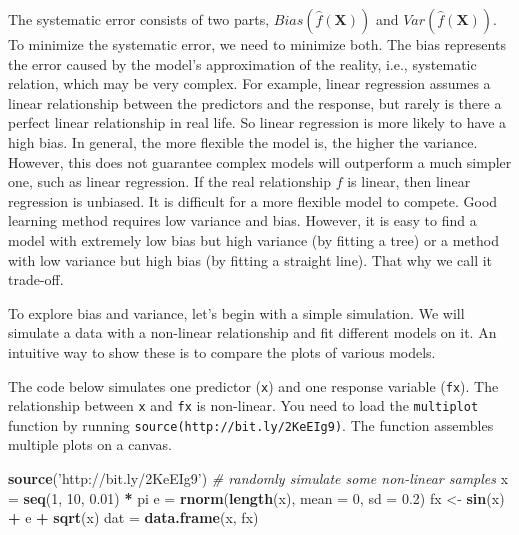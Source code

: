 \documentclass[12pt,]{krantz}
\makeatletter
\newenvironment{Shaded}{\begin{snugshade}}{\end{snugshade}}
\newcommand{\CommentTok}[1]{\textcolor[rgb]{0.37,0.37,0.37}{\textit{#1}}}
\newcommand{\DataTypeTok}[1]{\textcolor[rgb]{0.27,0.27,0.27}{#1}}
\newcommand{\DecValTok}[1]{\textcolor[rgb]{0.06,0.06,0.06}{#1}}
\newcommand{\FloatTok}[1]{\textcolor[rgb]{0.06,0.06,0.06}{#1}}
\newcommand{\KeywordTok}[1]{\textcolor[rgb]{0.27,0.27,0.27}{\textbf{#1}}}
\newcommand{\NormalTok}[1]{#1}
\newcommand{\OperatorTok}[1]{\textcolor[rgb]{0.43,0.43,0.43}{\textbf{#1}}}
\newcommand{\StringTok}[1]{\textcolor[rgb]{0.5,0.5,0.5}{#1}}
\newenvironment{kframe}{%
\medskip{}
\setlength{\fboxsep}{.8em}
 \def\at@end@of@kframe{}%
 \ifinner\ifhmode%
  \def\at@end@of@kframe{\end{minipage}}%
  \begin{minipage}{\columnwidth}%
 \fi\fi%
 \def\FrameCommand##1{\hskip\@totalleftmargin \hskip-\fboxsep
 \colorbox{shadecolor}{##1}\hskip-\fboxsep
     \hskip-\linewidth \hskip-\@totalleftmargin \hskip\columnwidth}%
 \MakeFramed {\advance\hsize-\width
   \@totalleftmargin\z@ \linewidth\hsize
   \@setminipage}}%
 {\par\unskip\endMakeFramed%
 \at@end@of@kframe}
\renewenvironment{Shaded}{\begin{kframe}}{\end{kframe}}
\makeatother
\begin{document}
The systematic error consists of two parts, \(Bias(\hat{f}(\mathbf{X}))\) and \(Var (\hat{f}(\mathbf{X}))\). To minimize the systematic error, we need to minimize both. The bias represents the error caused by the model's approximation of the reality, i.e., systematic relation, which may be very complex. For example, linear regression assumes a linear relationship between the predictors and the response, but rarely is there a perfect linear relationship in real life. So linear regression is more likely to have a high bias. In general, the more flexible the model is, the higher the variance. However, this does not guarantee complex models will outperform a much simpler one, such as linear regression. If the real relationship \(f\) is linear, then linear regression is unbiased. It is difficult for a more flexible model to compete. Good learning method requires low variance and bias. However, it is easy to find a model with extremely low bias but high variance (by fitting a tree) or a method with low variance but high bias (by fitting a straight line). That why we call it trade-off.

To explore bias and variance, let's begin with a simple simulation. We will simulate a data with a non-linear relationship and fit different models on it. An intuitive way to show these is to compare the plots of various models.

The code below simulates one predictor (\texttt{x}) and one response variable (\texttt{fx}). The relationship between \texttt{x} and \texttt{fx} is non-linear. You need to load the \texttt{multiplot} function by running \texttt{source(\textquotesingle{}http://bit.ly/2KeEIg9\textquotesingle{})}. The function assembles multiple plots on a canvas.

\begin{Shaded}
\begin{Highlighting}[]
\KeywordTok{source}\NormalTok{(}\StringTok{'http://bit.ly/2KeEIg9'}\NormalTok{)}
\CommentTok{# randomly simulate some non-linear samples}
\NormalTok{x =}\StringTok{ }\KeywordTok{seq}\NormalTok{(}\DecValTok{1}\NormalTok{, }\DecValTok{10}\NormalTok{, }\FloatTok{0.01}\NormalTok{) }\OperatorTok{*}\StringTok{ }\NormalTok{pi}
\NormalTok{e =}\StringTok{ }\KeywordTok{rnorm}\NormalTok{(}\KeywordTok{length}\NormalTok{(x), }\DataTypeTok{mean =} \DecValTok{0}\NormalTok{, }\DataTypeTok{sd =} \FloatTok{0.2}\NormalTok{)}
\NormalTok{fx <-}\StringTok{ }\KeywordTok{sin}\NormalTok{(x) }\OperatorTok{+}\StringTok{ }\NormalTok{e }\OperatorTok{+}\StringTok{ }\KeywordTok{sqrt}\NormalTok{(x)}
\NormalTok{dat =}\StringTok{ }\KeywordTok{data.frame}\NormalTok{(x, fx)}
\end{Highlighting}
\end{Shaded}
\end{document}
